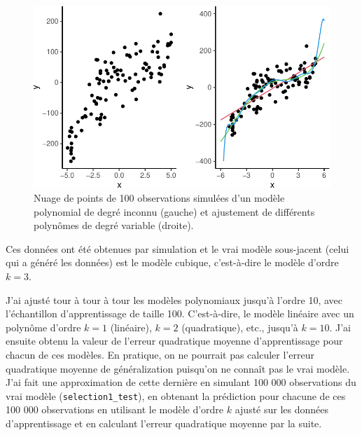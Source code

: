 \documentclass[
  11pt,
  letterpaper,
]{scrbook}
\theoremstyle{definition}
\theoremstyle{remark}
\begin{document}
\begin{figure}[ht!]

{\centering \includegraphics[width=1\textwidth,height=\textheight]{./04-selectionmodeles_files/figure-pdf/fig-donneestest-1.pdf}

}

\caption{\label{fig-donneestest}Nuage de points de 100 observations
simulées d'un modèle polynomial de degré inconnu (gauche) et ajustement
de différents polynômes de degré variable (droite).}

\end{figure}

Ces données ont été obtenues par simulation et le vrai modèle
sous-jacent (celui qui a généré les données) est le modèle cubique,
c'est-à-dire le modèle d'ordre \(k=3\).

J'ai ajusté tour à tour à tour les modèles polynomiaux jusqu'à l'ordre
10, avec l'échantillon d'apprentissage de taille 100. C'est-à-dire, le
modèle linéaire avec un polynôme d'ordre \(k=1\) (linéaire), \(k=2\)
(quadratique), etc., jusqu'à \(k=10\). J'ai ensuite obtenu la valeur de
l'erreur quadratique moyenne d'apprentissage pour chacun de ces modèles.
En pratique, on ne pourrait pas calculer l'erreur quadratique moyenne de
généralization puisqu'on ne connaît pas le vrai modèle. J'ai fait une
approximation de cette dernière en simulant 100 000 observations du vrai
modèle (\texttt{selection1\_test}), en obtenant la prédiction pour
chacune de ces 100 000 observations en utilisant le modèle d'ordre \(k\)
ajusté sur les données d'apprentissage et en calculant l'erreur
quadratique moyenne par la suite.
\end{document}
